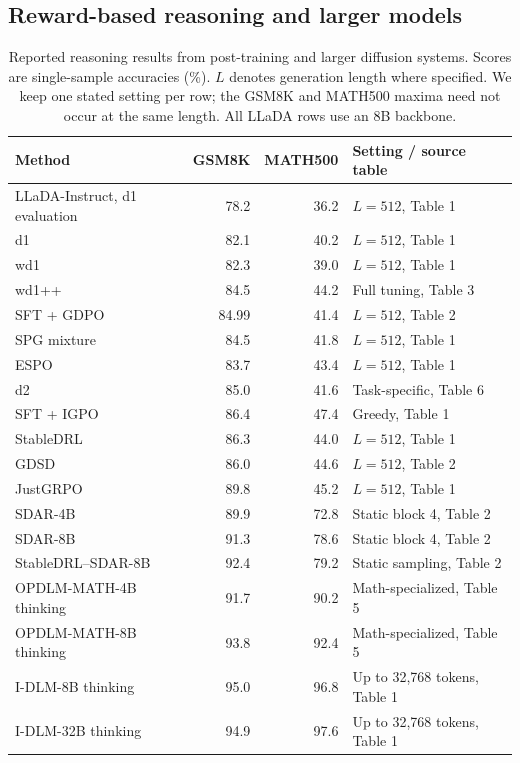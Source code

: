 \subsection{Reward-based reasoning and larger models}
\begin{table}[ht]
\caption{Reported reasoning results from post-training and larger diffusion systems. Scores are single-sample accuracies (\%). $L$ denotes generation length where specified. We keep one stated setting per row; the GSM8K and MATH500 maxima need not occur at the same length. All LLaDA rows use an 8B backbone.}
\label{tab:literaturerl}
\centering\small
\setlength{\tabcolsep}{4pt}
\begin{tabular}{lrrl}
\toprule
Method & GSM8K & MATH500 & Setting / source table\\
\midrule
LLaDA-Instruct, d1 evaluation \citep{d1} & 78.2 & 36.2 & $L=512$, Table 1\\
d1 \citep{d1} & 82.1 & 40.2 & $L=512$, Table 1\\
wd1 \citep{wd1} & 82.3 & 39.0 & $L=512$, Table 1\\
wd1++ \citep{wd1} & 84.5 & 44.2 & Full tuning, Table 3\\
SFT + GDPO \citep{gdpo} & 84.99 & 41.4 & $L=512$, Table 2\\
SPG mixture \citep{spg} & 84.5 & 41.8 & $L=512$, Table 1\\
ESPO \citep{espo} & 83.7 & 43.4 & $L=512$, Table 1\\
d2 \citep{d2} & 85.0 & 41.6 & Task-specific, Table 6\\
SFT + IGPO \citep{igpo} & 86.4 & 47.4 & Greedy, Table 1\\
StableDRL \citep{stabledrl} & 86.3 & 44.0 & $L=512$, Table 1\\
GDSD \citep{gdsd} & 86.0 & 44.6 & $L=512$, Table 2\\
JustGRPO \citep{justgrpo} & 89.8 & 45.2 & $L=512$, Table 1\\
\midrule
SDAR-4B \citep{sdar} & 89.9 & 72.8 & Static block 4, Table 2\\
SDAR-8B \citep{sdar} & 91.3 & 78.6 & Static block 4, Table 2\\
StableDRL--SDAR-8B \citep{stabledrl} & 92.4 & 79.2 & Static sampling, Table 2\\
OPDLM-MATH-4B thinking \citep{opdlm} & 91.7 & 90.2 & Math-specialized, Table 5\\
OPDLM-MATH-8B thinking \citep{opdlm} & 93.8 & 92.4 & Math-specialized, Table 5\\
I-DLM-8B thinking \citep{idllm} & 95.0 & 96.8 & Up to 32,768 tokens, Table 1\\
I-DLM-32B thinking \citep{idllm} & 94.9 & 97.6 & Up to 32,768 tokens, Table 1\\
\bottomrule
\end{tabular}
\end{table}

